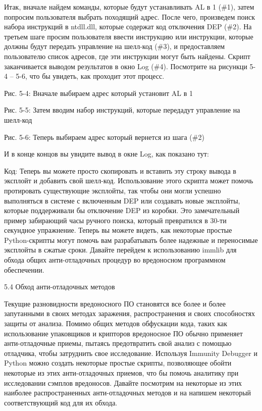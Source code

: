 \documentclass[12pt]{book}
\begin{document}
Итак, вначале найдем команды, которые будут устанавливать AL в 1 (\#1), затем попросим пользователя выбрать походящий адрес. После чего, произведем поиск набора инструкций в ntdll.dll, которые содержат код отключения DEP (\#2). На третьем шаге просим пользователя ввести инструкцию или инструкции, которые должны будут передать управление на шелл-код (\#3), и предоставляем пользователю список адресов, где эти инструкции могут быть найдены. Скрипт заканчивается выводом результатов в окно Log (\#4). Посмотрите на рисункци 5-4 – 5-6, что бы увидеть, как проходит этот процесс.


Рис. 5-4: Вначале выбираем адрес который установит AL в 1


Рис. 5-5: Затем вводим набор инструкций, которые передадут управление на шелл-код


Рис. 5-6: Теперь выбираем адрес который вернется из шага (\#2)

И в конце концов вы увидите вывод в окне Log, как показано тут:

Код:
Теперь вы можете просто скопировать и вставить эту строку вывода в эксплойт и добавить свой шелл-код. Использование этого скрипта может помочь протировать существующие эксплойты, так чтобы они могли успешно выполняться в системе с включенным DEP или создавать новые эксплойты, которые поддерживали бы отключение DEP из коробки. Это замечательный пример забирающий часы ручного поиска, который превратился в 30-ти секундное упражнение. Теперь вы можете видеть, как некоторые простые Python-скрипты могут помочь вам разрабатывать более надежные и переносимые эксплойты в сжатые сроки. Давайте перейдем к использованию immlib для обхода общих анти-отладочных процедур во вредоносном программном обеспечении. 


5.4 Обход анти-отладочных методов

Текущие разновидности вредоносного ПО становятся все более и более запутанными в своих методах заражения, распространения и своих способностях защиты от анализа. Помимо общих методов обфускации кода, таких как использование упаковщиков и крипторов вредоносное ПО обычно применяет анти-отладочные приемы, пытаясь предотвратить свой анализ с помощью отладчика, чтобы затруднить свое исследование. Используя Immunity Debugger и Python можно создать некоторые простые скрипты, позволяющее обойти некоторые из этих анти-отладочных приемов, что бы помочь аналитику при исследовании сэмплов вредоносов. Давайте посмотрим на некоторые из этих наиболее распространенных анти-отладочных методов и на напишем некоторый соответствующий код для их обхода.
\end{document}
